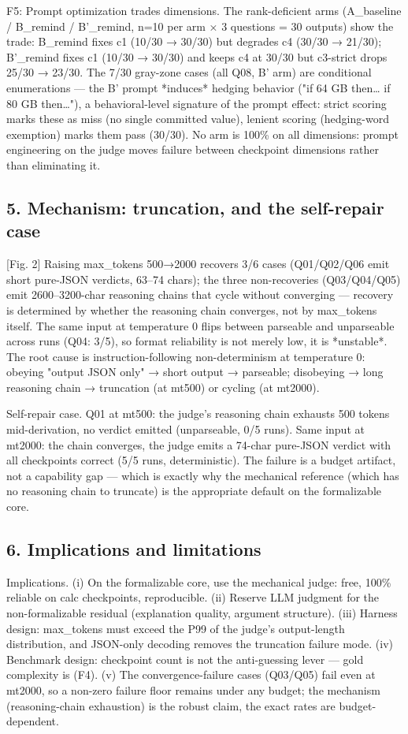 \documentclass[10pt]{article}
\begin{document}
F5: Prompt optimization trades dimensions. The rank-deficient arms (A\_baseline / B\_remind / B'\_remind, n=10 per arm × 3 questions = 30 outputs) show the trade: B\_remind fixes c1 (10/30 → 30/30) but degrades c4 (30/30 → 21/30); B'\_remind fixes c1 (10/30 → 30/30) and keeps c4 at 30/30 but c3-strict drops 25/30 → 23/30. The 7/30 gray-zone cases (all Q08, B' arm) are conditional enumerations — the B' prompt *induces* hedging behavior ("if 64 GB then… if 80 GB then…"), a behavioral-level signature of the prompt effect: strict scoring marks these as miss (no single committed value), lenient scoring (hedging-word exemption) marks them pass (30/30). No arm is 100\% on all dimensions: prompt engineering on the judge moves failure between checkpoint dimensions rather than eliminating it.

\subsection*{5. Mechanism: truncation, and the self-repair case}

[Fig. 2] Raising max\_tokens 500→2000 recovers 3/6 cases (Q01/Q02/Q06 emit short pure-JSON verdicts, 63–74 chars); the three non-recoveries (Q03/Q04/Q05) emit 2600–3200-char reasoning chains that cycle without converging — recovery is determined by whether the reasoning chain converges, not by max\_tokens itself. The same input at temperature 0 flips between parseable and unparseable across runs (Q04: 3/5), so format reliability is not merely low, it is *unstable*. The root cause is instruction-following non-determinism at temperature 0: obeying "output JSON only" → short output → parseable; disobeying → long reasoning chain → truncation (at mt500) or cycling (at mt2000).

Self-repair case. Q01 at mt500: the judge's reasoning chain exhausts 500 tokens mid-derivation, no verdict emitted (unparseable, 0/5 runs). Same input at mt2000: the chain converges, the judge emits a 74-char pure-JSON verdict with all checkpoints correct (5/5 runs, deterministic). The failure is a budget artifact, not a capability gap — which is exactly why the mechanical reference (which has no reasoning chain to truncate) is the appropriate default on the formalizable core.

\subsection*{6. Implications and limitations}

Implications. (i) On the formalizable core, use the mechanical judge: free, 100\% reliable on calc checkpoints, reproducible. (ii) Reserve LLM judgment for the non-formalizable residual (explanation quality, argument structure). (iii) Harness design: max\_tokens must exceed the P99 of the judge's output-length distribution, and JSON-only decoding removes the truncation failure mode. (iv) Benchmark design: checkpoint count is not the anti-guessing lever — gold complexity is (F4). (v) The convergence-failure cases (Q03/Q05) fail even at mt2000, so a non-zero failure floor remains under any budget; the mechanism (reasoning-chain exhaustion) is the robust claim, the exact rates are budget-dependent.
\end{document}
